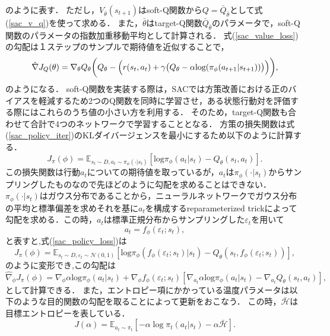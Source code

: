 \documentclass[dvipdfmx]{ampbt_nomag}
\begin{document}
のように表す．
ただし，$V_{\bar{\theta}}(s_{t+1})$はsoft-Q関数から$Q=\bar{Q}_{\bar{\theta}}$として式(\ref{sac_v_q})を使って求める．
また，$\bar{\theta}$はtarget-Q関数$\bar{Q}_{\bar{\theta}}$のパラメータで，soft-Q関数のパラメータの指数加重移動平均として計算される．
式(\ref{sac_value_loss})の勾配は１ステップのサンプルで期待値を近似することで，
\begin{eqnarray}
  \hat{\nabla}J_Q(\theta) = \nabla_\theta Q_\theta\biggl(Q_\theta - \Bigl(r(s_t,a_t) + \gamma \bigl(Q_\theta - \alpha \textrm{log}(\pi_{\phi}(a_{t+1}|s_{t+1}))\bigl)\Bigl)\biggl),
\end{eqnarray}
のようになる．
soft-Q関数を実装する際は，SACでは方策改善における正のバイアスを軽減するため2つのQ関数を同時に学習させ，ある状態行動対を評価する際にはこれらのうち値の小さい方を利用する\cite{DoubleQ}．
そのため，target-Q関数も合わせて合計で4つのネットワークで学習することとなる．
方策の損失関数は式(\ref{sac_policy_iter})のKLダイバージェンスを最小にするため以下のように計算する．
\begin{equation} \label{sac_policy_loss}
  J_\pi(\phi) = \mathbb{E}_{s_t \sim D,a_t\sim\pi_\phi(\cdot|s_t)} \left[\textrm{log}\pi_\phi(a_t | s_t) - Q_\theta(s_t,a_t)\right].
\end{equation}
この損失関数は行動$a_t$についての期待値を取っているが，$a_t$は$\pi_\phi(\cdot|s_t)$からサンプリングしたものなので先ほどのように勾配を求めることはできない．$\pi_\phi(\cdot|s_t)$はガウス分布であることから，ニューラルネットワークでガウス分布の平均と標準偏差を求めそれを基に$a_t$を構成するreparameterized trickによって勾配を求める．この時，$a_t$は標準正規分布からサンプリングした$\varepsilon_t$を用いて
\begin{equation} \label{reparameterization}
  a_t = f_\phi(\varepsilon_t;s_t),
\end{equation}
と表すと,式(\ref{sac_policy_loss})は
\begin{equation} \label{sac_policy_loss_reparameterized}
  J_\pi(\phi) = \mathbb{E}_{s_t \sim D,\varepsilon_t \sim \mathcal{N}(0,1)} \left[\textrm{log}\pi_\phi(f_\phi(\varepsilon_t;s_t) | s_t) - Q_\theta(s_t,f_\phi(\varepsilon_t;s_t))\right],
\end{equation}
のように変形でき,この勾配は
\begin{equation} \label{sac_policy_gradient}
  \hat{\nabla}_\phi J_\pi(\phi) = \nabla_\phi \alpha \textrm{log}\pi_\phi(a_t|s_t) + \nabla_\phi f_\phi(\varepsilon_t;s_t)[\nabla_{a_t}\alpha \textrm{log} \pi_\phi(a_t|s_t) - \nabla_{a_t}Q_\theta(s_t,a_t)],
\end{equation}
として計算できる．
また，エントロピー項にかかっている温度パラメータは以下のような目的関数の勾配を取ることによって更新をおこなう\cite{SAC2}．
この時，$\bar{\mathcal{H}}$は目標エントロピーを表している．
\begin{equation} \label{temparature_tunning}
  J(\alpha) = \mathbb{E}_{a_t\sim\pi_t}[-\alpha \log{\pi_t(a_t|s_t)} -\alpha\bar{\mathcal{H}}].
\end{equation}
\end{document}
